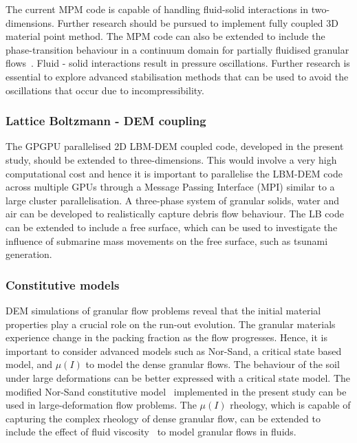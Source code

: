 The current MPM code is capable of handling fluid-solid interactions in 
two-dimensions. Further research should be pursued to implement fully coupled 
3D 
material point method. The MPM code can also be extended to include the 
phase-transition behaviour in a continuum domain for partially fluidised 
granular flows~\citep{Aranson2002, Aranson2001, Volfson2003}. Fluid - solid 
interactions result in pressure oscillations. Further research is essential to 
explore advanced stabilisation methods that can be used to avoid the 
oscillations that occur due to incompressibility.

\subsubsection*{Lattice Boltzmann - DEM coupling}

The GPGPU parallelised 2D LBM-DEM coupled code, developed in the present study, 
should be extended to three-dimensions. This would involve a very high 
computational cost and hence it is important to parallelise the LBM-DEM code 
across multiple GPUs through a Message Passing Interface (MPI) similar to a 
large cluster parallelisation. A three-phase system of granular solids, water 
and air can be developed to realistically capture debris flow behaviour. The LB 
code can be extended to include a free surface, which can be used to 
investigate the influence of submarine mass movements on the free surface, such 
as tsunami generation.

\subsubsection*{Constitutive models}

DEM simulations of granular flow problems reveal that the initial material 
properties play a crucial role on the run-out evolution. The granular materials 
experience change in the packing fraction as the flow progresses. Hence, it is 
important to consider advanced models such as Nor-Sand, a critical state based 
model, and $\mu(I)$  to model the dense granular flows. The behaviour of the 
soil under large deformations can be better expressed with a critical state 
model. The modified Nor-Sand constitutive model~\citep{Robert2010} implemented 
in the present study can be used in large-deformation flow problems. The 
$\mu(I)$ rheology, which is capable of capturing the complex rheology of dense 
granular flow, can be extended to include the effect of fluid 
viscosity~\citep{Pouliquen2005} to model granular flows in fluids. 


